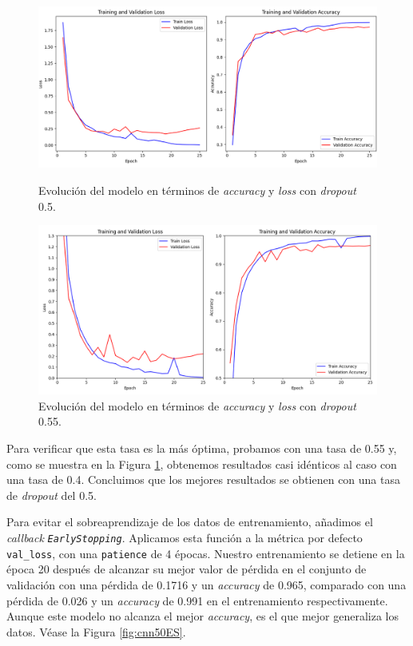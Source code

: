 \begin{figure}[h]
    \centering
    \begin{minipage}{0.45\textwidth}
        \centering
        \includegraphics[width=\textwidth]{img/modeloCNN_MMC.png} %
        \caption{Evolución del modelo en términos de \textit{accuracy} y \textit{loss} con \textit{dropout} 0.5.}
        \label{fig:cnn50}
    \end{minipage}\hfill
    \begin{minipage}{0.45\textwidth}
        \centering
        \includegraphics[width=\textwidth]{img/malware_classifier_dropout55.png} 
        \caption{Evolución del modelo en términos de \textit{accuracy} y \textit{loss} con \textit{dropout} 0.55.}
        \label{fig:cnn55}
    \end{minipage}
\end{figure}

Para verificar que esta tasa es la más óptima, probamos con una tasa de 0.55 y, como se muestra en la Figura \ref{fig:cnn55}, obtenemos resultados casi idénticos al caso con una tasa de 0.4. Concluimos que los mejores resultados se obtienen con una tasa de \textit{dropout} del 0.5.

Para evitar el sobreaprendizaje de los datos de entrenamiento, añadimos el \textit{callback} \textit{\lstinline|EarlyStopping|}. Aplicamos esta función a la métrica por defecto \lstinline|val_loss|, con una \lstinline|patience| de 4 épocas. Nuestro entrenamiento se detiene en la época 20 después de alcanzar su mejor valor de pérdida en el conjunto de validación con una pérdida de 0.1716 y un \textit{accuracy} de 0.965, comparado con una pérdida de 0.026 y un \textit{accuracy} de 0.991 en el entrenamiento respectivamente. Aunque este modelo no alcanza el mejor \textit{accuracy}, es el que mejor generaliza los datos. Véase la Figura \ref{fig:cnn50ES}.

